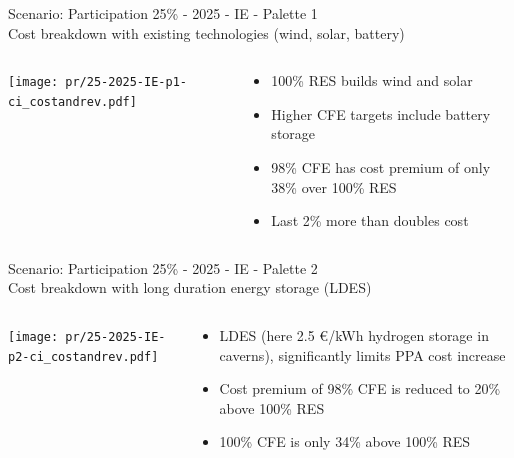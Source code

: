 \begin{frame}{Scenario: Participation 25\% - 2025 - IE - Palette 1 \\
Cost breakdown with existing technologies (wind, solar, battery)}

\begin{columns}[T]
\begin{column}{9cm}
\centering

\texttt{[image: pr/25-2025-IE-p1-ci\_costandrev.pdf]}
\end{column}
\begin{column}{5cm}

  \vspace{.5cm}

  \begin{itemize}
  \item 100\% RES builds wind and solar
  \item Higher CFE targets \alert{include battery storage}
  \item 98\% CFE has \alert{cost premium of only 38\%} over 100\% RES
  \item Last 2\% more than \alert{doubles cost}
  \end{itemize}
\end{column}
\end{columns}

\end{frame}



\begin{frame}{Scenario: Participation 25\% - 2025 - IE - Palette 2 \\
Cost breakdown with long duration energy storage (LDES)}

\begin{columns}[T]
\begin{column}{9cm}
\centering

\texttt{[image: pr/25-2025-IE-p2-ci\_costandrev.pdf]}
\end{column}
\begin{column}{5cm}

  \vspace{.5cm}

  \begin{itemize}
  \item LDES (here 2.5 €/kWh hydrogen storage in caverns), significantly \alert{limits PPA cost increase}
  \item Cost premium of 98\% CFE is reduced to \alert{20\%} above 100\% RES
  \item 100\% CFE is \alert{only 34\%} above 100\% RES
  \end{itemize}
\end{column}
\end{columns}

\end{frame}


